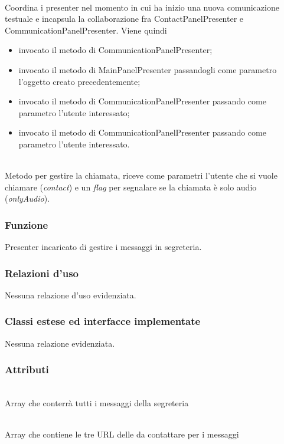 \begin{description}
\item{}\\
Coordina i presenter nel momento in cui ha inizio una nuova comunicazione testuale e incapsula la collaborazione fra ContactPanelPresenter e CommunicationPanelPresenter. Viene quindi
\begin{itemize}
\item invocato il metodo  di CommunicationPanelPresenter;
\item invocato il metodo  di MainPanelPresenter passandogli come parametro l'oggetto creato precedentemente;
\item invocato il metodo  di CommunicationPanelPresenter passando come parametro l'utente interessato;
\item invocato il metodo  di CommunicationPanelPresenter passando come parametro l'utente interessato.
\end{itemize} 

\item{}\\
Metodo per gestire la chiamata, riceve come parametri l'utente che si vuole chiamare (\textit{contact}) e un \textit{flag} per segnalare se la chiamata è solo audio (\textit{onlyAudio}).

\end{description}


\subsubsection*{Funzione}
Presenter incaricato di gestire i messaggi in segreteria.

\subsubsection*{Relazioni d'uso}
Nessuna relazione d'uso evidenziata.

\subsubsection*{Classi estese ed interfacce implementate}
Nessuna relazione evidenziata.

\subsubsection*{Attributi}
\begin{description}
\item{}\\
Array che conterrà tutti i messaggi della segreteria
\item{}\\
Array che contiene le tre URL delle  da contattare per i messaggi
\end{description}

